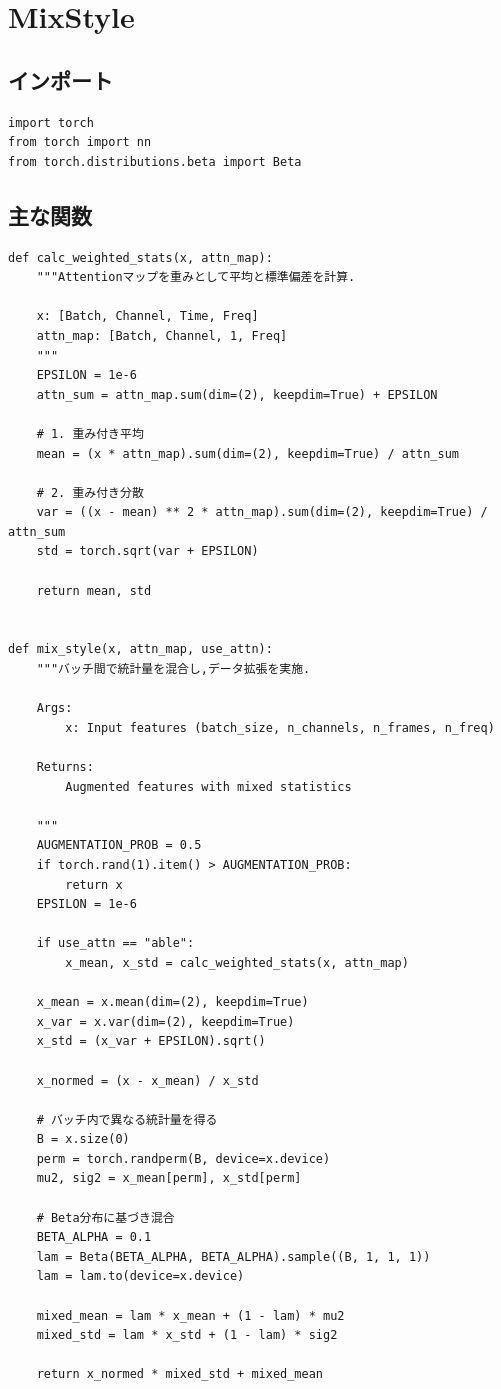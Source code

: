 \documentclass[../main.tex]{subfiles}
\begin{document}
\section{MixStyle}
\subsection{インポート}
\begin{verbatim}
import torch
from torch import nn
from torch.distributions.beta import Beta
\end{verbatim}

\subsection{主な関数}
\begin{verbatim}
def calc_weighted_stats(x, attn_map):
    """Attentionマップを重みとして平均と標準偏差を計算.

    x: [Batch, Channel, Time, Freq]
    attn_map: [Batch, Channel, 1, Freq]
    """
    EPSILON = 1e-6
    attn_sum = attn_map.sum(dim=(2), keepdim=True) + EPSILON

    # 1. 重み付き平均
    mean = (x * attn_map).sum(dim=(2), keepdim=True) / attn_sum

    # 2. 重み付き分散
    var = ((x - mean) ** 2 * attn_map).sum(dim=(2), keepdim=True) / attn_sum
    std = torch.sqrt(var + EPSILON)

    return mean, std


def mix_style(x, attn_map, use_attn):
    """バッチ間で統計量を混合し,データ拡張を実施.

    Args:
        x: Input features (batch_size, n_channels, n_frames, n_freq)

    Returns:
        Augmented features with mixed statistics

    """
    AUGMENTATION_PROB = 0.5
    if torch.rand(1).item() > AUGMENTATION_PROB:
        return x
    EPSILON = 1e-6

    if use_attn == "able":
        x_mean, x_std = calc_weighted_stats(x, attn_map)

    x_mean = x.mean(dim=(2), keepdim=True)
    x_var = x.var(dim=(2), keepdim=True)
    x_std = (x_var + EPSILON).sqrt()

    x_normed = (x - x_mean) / x_std

    # バッチ内で異なる統計量を得る
    B = x.size(0)
    perm = torch.randperm(B, device=x.device)
    mu2, sig2 = x_mean[perm], x_std[perm]

    # Beta分布に基づき混合
    BETA_ALPHA = 0.1
    lam = Beta(BETA_ALPHA, BETA_ALPHA).sample((B, 1, 1, 1))
    lam = lam.to(device=x.device)

    mixed_mean = lam * x_mean + (1 - lam) * mu2
    mixed_std = lam * x_std + (1 - lam) * sig2

    return x_normed * mixed_std + mixed_mean
\end{verbatim}
\end{document}
